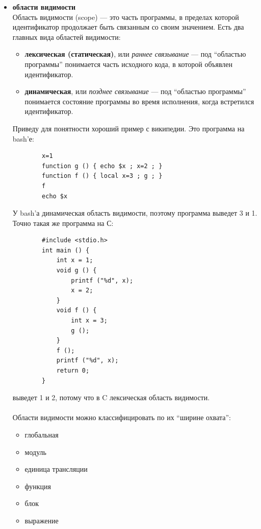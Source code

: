 \documentclass[11pt]{book}
\begin{document}
\begin{itemize}
\item \textbf{области видимости}
    \\
    Область видимости (scope) --- это часть программы, в пределах которой идентификатор продолжает быть связанным со своим значением.
    Есть два главных вида областей видимости:
    \begin{itemize}
    \item \textbf{лексическая (статическая)}, или \emph{раннее связывание} ---
        под ``областью программы'' понимается часть исходного кода, в которой объявлен идентификатор.
    \item \textbf{динамическая}, или \emph{позднее связывание} ---
        под ``областью программы'' понимается состояние программы во время исполнения, когда встретился идентификатор.
    \end{itemize}
    Приведу для понятности хороший пример с википедии. Это программа на bash'е:
    \begin{verbatim}
        x=1
        function g () { echo $x ; x=2 ; }
        function f () { local x=3 ; g ; }
        f
        echo $x
    \end{verbatim}
    У bash'а динамическая область видимости, поэтому программа выведет 3 и 1.
    Точно такая же программа на С:
    \begin{verbatim}
        #include <stdio.h>
        int main () {
            int x = 1;
            void g () {
                printf ("%d", x);
                x = 2;
            }
            void f () {
                int x = 3;
                g ();
            }
            f ();
            printf ("%d", x);
            return 0;
        }
    \end{verbatim}
    выведет 1 и 2, потому что в C лексическая область видимости.
    \\ \\
    Области видимости можно классифицировать по их ``ширине охвата'':
    \begin{itemize}
    \item глобальная
    \item модуль
    \item единица трансляции
    \item функция
    \item блок
    \item выражение
    \end{itemize}


\end{itemize}
\end{document}
